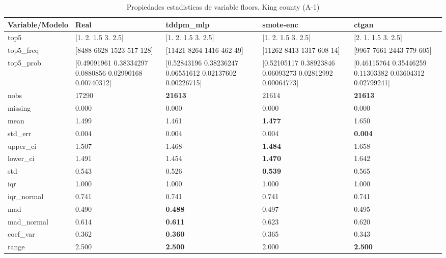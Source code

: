\begin{table}[H]
\centering
\fontsize{8}{14}\selectfont
\caption{Propiedades  estadisticas de variable floors, King county (A-1)}
\label{table-stats-king county-a-1-floors}
\begin{tabular}{|l|m{10em}|m{10em}|m{10em}|m{10em}|}
\hline
 \rowcolor[gray]{0.8}
Variable/Modelo & Real & tddpm\_mlp & smote-enc & ctgan \\
\hline top5 & [1.  2.  1.5 3.  2.5] & [1.  2.  1.5 3.  2.5] & [1.  2.  1.5 3.  2.5] & [2.  1.  1.5 3.  2.5] \\
\hline top5\_freq & [8488 6628 1523  517  128] & [11421  8264  1416   462    49] & [11262  8413  1317   608    14] & [9967 7661 2443  779  605] \\
\hline top5\_prob & [0.49091961 0.38334297 0.0880856  0.02990168 0.00740312] & [0.52843196 0.38236247 0.06551612 0.02137602 0.00226715] & [0.52105117 0.38923846 0.06093273 0.02812992 0.00064773] & [0.46115764 0.35446259 0.11303382 0.03604312 0.02799241] \\
\hline nobs & 17290 & \bfseries 21613 & \cellcolor[rgb]{0.9, 0.54, 0.52} 21614 & \bfseries 21613 \\
\hline missing & 0.000 & 0.000 & 0.000 & 0.000 \\
\hline mean & 1.499 & 1.461 & \bfseries 1.477 & \cellcolor[rgb]{0.9, 0.54, 0.52} 1.650 \\
\hline std\_err & 0.004 & \cellcolor[rgb]{0.9, 0.54, 0.52} 0.004 & 0.004 & \bfseries 0.004 \\
\hline upper\_ci & 1.507 & 1.468 & \bfseries 1.484 & \cellcolor[rgb]{0.9, 0.54, 0.52} 1.658 \\
\hline lower\_ci & 1.491 & 1.454 & \bfseries 1.470 & \cellcolor[rgb]{0.9, 0.54, 0.52} 1.642 \\
\hline std & 0.543 & 0.526 & \bfseries 0.539 & \cellcolor[rgb]{0.9, 0.54, 0.52} 0.565 \\
\hline iqr & 1.000 & 1.000 & 1.000 & 1.000 \\
\hline iqr\_normal & 0.741 & 0.741 & 0.741 & 0.741 \\
\hline mad & 0.490 & \bfseries 0.488 & \cellcolor[rgb]{0.9, 0.54, 0.52} 0.497 & 0.495 \\
\hline mad\_normal & 0.614 & \bfseries 0.611 & \cellcolor[rgb]{0.9, 0.54, 0.52} 0.623 & 0.620 \\
\hline coef\_var & 0.362 & \bfseries 0.360 & 0.365 & \cellcolor[rgb]{0.9, 0.54, 0.52} 0.343 \\
\hline range & 2.500 & \bfseries 2.500 & \cellcolor[rgb]{0.9, 0.54, 0.52} 2.000 & \bfseries 2.500 \\

\end{tabular}
\end{table}
